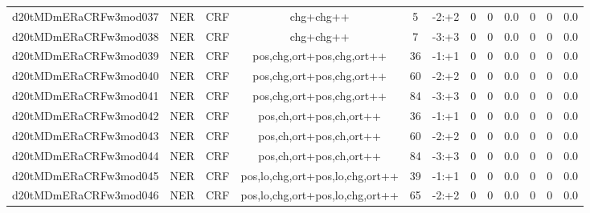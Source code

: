 \documentclass[a4paper]{article}
\begin{document}
\begin{landscape}
\begin{center}
\begin{tabular}{ |c|c|c|c|c|c|c|c|c|c|c|c|}
 
 	
 	\small{ d20tMDmERaCRFw3mod037 } & \small{ NER} & \small{  CRF }  & chg+chg++  &  5 &  \small{  -2:+2 }  &  0 & 0 & 0.0  &  0 & 0 & 0.0 \\
 	

 
 	
 	\small{ d20tMDmERaCRFw3mod038 } & \small{ NER} & \small{  CRF }  & chg+chg++  &  7 &  \small{  -3:+3 }  &  0 & 0 & 0.0  &  0 & 0 & 0.0 \\
 	

 
 	
 	\small{ d20tMDmERaCRFw3mod039 } & \small{ NER} & \small{  CRF }  & pos,chg,ort+pos,chg,ort++  &  36 &  \small{  -1:+1 }  &  0 & 0 & 0.0  &  0 & 0 & 0.0 \\
 	

 
 	
 	\small{ d20tMDmERaCRFw3mod040 } & \small{ NER} & \small{  CRF }  & pos,chg,ort+pos,chg,ort++  &  60 &  \small{  -2:+2 }  &  0 & 0 & 0.0  &  0 & 0 & 0.0 \\
 	

 
 	
 	\small{ d20tMDmERaCRFw3mod041 } & \small{ NER} & \small{  CRF }  & pos,chg,ort+pos,chg,ort++  &  84 &  \small{  -3:+3 }  &  0 & 0 & 0.0  &  0 & 0 & 0.0 \\
 	

 
 	
 	\small{ d20tMDmERaCRFw3mod042 } & \small{ NER} & \small{  CRF }  & pos,ch,ort+pos,ch,ort++  &  36 &  \small{  -1:+1 }  &  0 & 0 & 0.0  &  0 & 0 & 0.0 \\
 	

 
 	
 	\small{ d20tMDmERaCRFw3mod043 } & \small{ NER} & \small{  CRF }  & pos,ch,ort+pos,ch,ort++  &  60 &  \small{  -2:+2 }  &  0 & 0 & 0.0  &  0 & 0 & 0.0 \\
 	

 
 	
 	\small{ d20tMDmERaCRFw3mod044 } & \small{ NER} & \small{  CRF }  & pos,ch,ort+pos,ch,ort++  &  84 &  \small{  -3:+3 }  &  0 & 0 & 0.0  &  0 & 0 & 0.0 \\
 	

 
 	
 	\small{ d20tMDmERaCRFw3mod045 } & \small{ NER} & \small{  CRF }  & pos,lo,chg,ort+pos,lo,chg,ort++  &  39 &  \small{  -1:+1 }  &  0 & 0 & 0.0  &  0 & 0 & 0.0 \\
 	

 
 	
 	\small{ d20tMDmERaCRFw3mod046 } & \small{ NER} & \small{  CRF }  & pos,lo,chg,ort+pos,lo,chg,ort++  &  65 &  \small{  -2:+2 }  &  0 & 0 & 0.0  &  0 & 0 & 0.0 \\
 	


\end{tabular}
\end{center}
\end{landscape}
\end{document}
